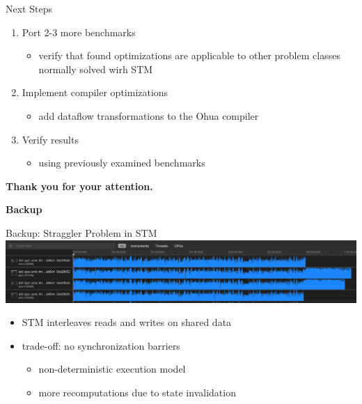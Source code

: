 \documentclass[aspectratio=169, usenames, dvipsnames]{beamer}
\begin{document}
\begin{frame}{Next Steps}
  \begin{enumerate}
    \item Port 2-3 more benchmarks
    \begin{itemize}
      \item verify that found optimizations are applicable to other problem classes normally solved wirh STM\\[1.2\baselineskip]
    \end{itemize}
    \item<2-> Implement compiler optimizations
    \begin{itemize}
      \item<2-> add dataflow transformations to the Ohua compiler\\[1.2\baselineskip]
    \end{itemize}
    \item<3-> Verify results
    \begin{itemize}
      \item<3-> using previously examined benchmarks
    \end{itemize}
  \end{enumerate}
\end{frame}

\begin{frame}
  \centering
  \huge
  \alert{\textbf{Thank you for your attention.}}
\end{frame}


\begin{frame}
  \centering
  \huge
  \alert{\textbf{Backup}}
\end{frame}

\begin{frame}{Backup: Straggler Problem in STM}
  \includegraphics[width=\textwidth,keepaspectratio]{img/cpu_load_stm.png}

  \vfill
  \begin{itemize}
    \item<2-> STM interleaves reads and writes on shared data
    \item<3-> trade-off: no synchronization barriers \\[.55\baselineskip]
    \begin{itemize}
      \item<4-> non-deterministic execution model
      \item<4-> more recomputations due to state invalidation
    \end{itemize}
  \end{itemize}
\end{frame}
\end{document}
